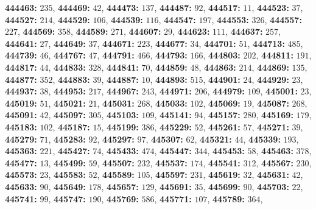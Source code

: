 \textsf{\bfseries 444463:} $235$, \textsf{\bfseries 444469:} $42$, \textsf{\bfseries 444473:} $137$, \textsf{\bfseries 444487:} $92$, \textsf{\bfseries 444517:} $11$, \textsf{\bfseries 444523:} $37$, \textsf{\bfseries 444527:} $214$, \textsf{\bfseries 444529:} $106$, \textsf{\bfseries 444539:} $116$, \textsf{\bfseries 444547:} $197$, \textsf{\bfseries 444553:} $326$, \textsf{\bfseries 444557:} $227$, \textsf{\bfseries 444569:} $358$, \textsf{\bfseries 444589:} $271$, \textsf{\bfseries 444607:} $29$, \textsf{\bfseries 444623:} $111$, \textsf{\bfseries 444637:} $257$, \textsf{\bfseries 444641:} $27$, \textsf{\bfseries 444649:} $37$, \textsf{\bfseries 444671:} $223$, \textsf{\bfseries 444677:} $34$, \textsf{\bfseries 444701:} $51$, \textsf{\bfseries 444713:} $485$, \textsf{\bfseries 444739:} $46$, \textsf{\bfseries 444767:} $47$, \textsf{\bfseries 444791:} $466$, \textsf{\bfseries 444793:} $166$, \textsf{\bfseries 444803:} $202$, \textsf{\bfseries 444811:} $191$, \textsf{\bfseries 444817:} $44$, \textsf{\bfseries 444833:} $328$, \textsf{\bfseries 444841:} $70$, \textsf{\bfseries 444859:} $48$, \textsf{\bfseries 444863:} $214$, \textsf{\bfseries 444869:} $135$, \textsf{\bfseries 444877:} $352$, \textsf{\bfseries 444883:} $39$, \textsf{\bfseries 444887:} $10$, \textsf{\bfseries 444893:} $515$, \textsf{\bfseries 444901:} $24$, \textsf{\bfseries 444929:} $23$, \textsf{\bfseries 444937:} $38$, \textsf{\bfseries 444953:} $217$, \textsf{\bfseries 444967:} $243$, \textsf{\bfseries 444971:} $206$, \textsf{\bfseries 444979:} $109$, \textsf{\bfseries 445001:} $23$, \textsf{\bfseries 445019:} $51$, \textsf{\bfseries 445021:} $21$, \textsf{\bfseries 445031:} $268$, \textsf{\bfseries 445033:} $102$, \textsf{\bfseries 445069:} $19$, \textsf{\bfseries 445087:} $268$, \textsf{\bfseries 445091:} $42$, \textsf{\bfseries 445097:} $305$, \textsf{\bfseries 445103:} $109$, \textsf{\bfseries 445141:} $94$, \textsf{\bfseries 445157:} $280$, \textsf{\bfseries 445169:} $179$, \textsf{\bfseries 445183:} $102$, \textsf{\bfseries 445187:} $15$, \textsf{\bfseries 445199:} $386$, \textsf{\bfseries 445229:} $52$, \textsf{\bfseries 445261:} $57$, \textsf{\bfseries 445271:} $39$, \textsf{\bfseries 445279:} $71$, \textsf{\bfseries 445283:} $92$, \textsf{\bfseries 445297:} $97$, \textsf{\bfseries 445307:} $62$, \textsf{\bfseries 445321:} $44$, \textsf{\bfseries 445339:} $193$, \textsf{\bfseries 445363:} $221$, \textsf{\bfseries 445427:} $74$, \textsf{\bfseries 445433:} $474$, \textsf{\bfseries 445447:} $344$, \textsf{\bfseries 445453:} $58$, \textsf{\bfseries 445463:} $378$, \textsf{\bfseries 445477:} $13$, \textsf{\bfseries 445499:} $59$, \textsf{\bfseries 445507:} $232$, \textsf{\bfseries 445537:} $174$, \textsf{\bfseries 445541:} $312$, \textsf{\bfseries 445567:} $230$, \textsf{\bfseries 445573:} $23$, \textsf{\bfseries 445583:} $52$, \textsf{\bfseries 445589:} $105$, \textsf{\bfseries 445597:} $231$, \textsf{\bfseries 445619:} $32$, \textsf{\bfseries 445631:} $42$, \textsf{\bfseries 445633:} $90$, \textsf{\bfseries 445649:} $178$, \textsf{\bfseries 445657:} $129$, \textsf{\bfseries 445691:} $35$, \textsf{\bfseries 445699:} $90$, \textsf{\bfseries 445703:} $22$, \textsf{\bfseries 445741:} $99$, \textsf{\bfseries 445747:} $190$, \textsf{\bfseries 445769:} $586$, \textsf{\bfseries 445771:} $107$, \textsf{\bfseries 445789:} $364$, 
